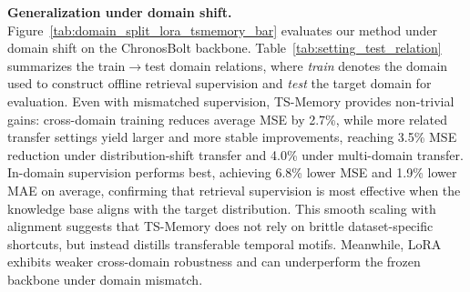 \noindent\textbf{Generalization under domain shift.}
\label{sec:transfer_domain_shift}
Figure~\ref{tab:domain_split_lora_tsmemory_bar} evaluates our method under domain shift on the ChronosBolt backbone. 
Table~\ref{tab:setting_test_relation} summarizes the train$\rightarrow
$test domain relations, where \textit{train} denotes the domain used to construct offline retrieval supervision and \textit{test} the target domain for evaluation.
Even with mismatched supervision, TS-Memory provides non-trivial gains: cross-domain training reduces average MSE by 2.7\%, while more related transfer settings yield larger and more stable improvements, reaching 3.5\% MSE reduction under distribution-shift transfer and 4.0\% under multi-domain transfer. In-domain supervision performs best, achieving 6.8\% lower MSE and 1.9\% lower MAE on average, confirming that retrieval supervision is most effective when the knowledge base aligns with the target distribution. This smooth scaling with alignment suggests that TS-Memory does not rely on brittle dataset-specific shortcuts, but instead distills transferable temporal motifs. Meanwhile, LoRA exhibits weaker cross-domain robustness and can underperform the frozen backbone under domain mismatch. 





